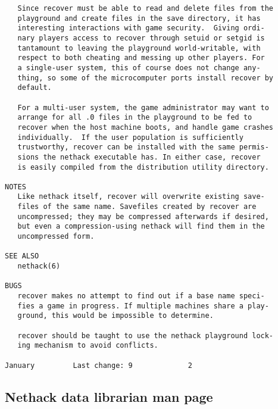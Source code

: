 \documentclass[11pt]{article}
\begin{document}
\begin{verbatim}
   Since recover must be able to read and delete files from the
   playground and create files in the save directory, it has
   interesting interactions with game security.  Giving ordi-
   nary players access to recover through setuid or setgid is
   tantamount to leaving the playground world-writable, with
   respect to both cheating and messing up other players. For
   a single-user system, this of course does not change any-
   thing, so some of the microcomputer ports install recover by
   default.

   For a multi-user system, the game administrator may want to
   arrange for all .0 files in the playground to be fed to
   recover when the host machine boots, and handle game crashes
   individually.  If the user population is sufficiently
   trustworthy, recover can be installed with the same permis-
   sions the nethack executable has. In either case, recover
   is easily compiled from the distribution utility directory.

NOTES
   Like nethack itself, recover will overwrite existing save-
   files of the same name. Savefiles created by recover are
   uncompressed; they may be compressed afterwards if desired,
   but even a compression-using nethack will find them in the
   uncompressed form.

SEE ALSO
   nethack(6)

BUGS
   recover makes no attempt to find out if a base name speci-
   fies a game in progress. If multiple machines share a play-
   ground, this would be impossible to determine.

   recover should be taught to use the nethack playground lock-
   ing mechanism to avoid conflicts.

January         Last change: 9             2

\end{verbatim}

\subsection{Nethack data librarian man page}
\label{sec:org46894cd}
\end{document}
